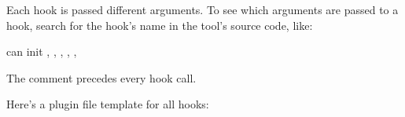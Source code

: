 \documentclass[letterpaper,10pt,english]{sphinxmanual}
\begin{document}
Each hook is passed different arguments.  To see which arguments are passed
to a hook, search for the hook’s name in the tool’s source code, like:

\begin{sphinxVerbatim}[commandchars=\\\{\}]
    \PYGZhy{}\PYGZgt{}can  
   \PYGZhy{}\PYGZgt{}init
             \PYGZgt{} ,
         \PYGZgt{} ,
         \PYGZgt{} ,
               \PYGZgt{} ,
       \PYGZgt{} ,
\end{sphinxVerbatim}

The comment  precedes every hook call.

Here’s a plugin file template for all hooks:
\end{document}
